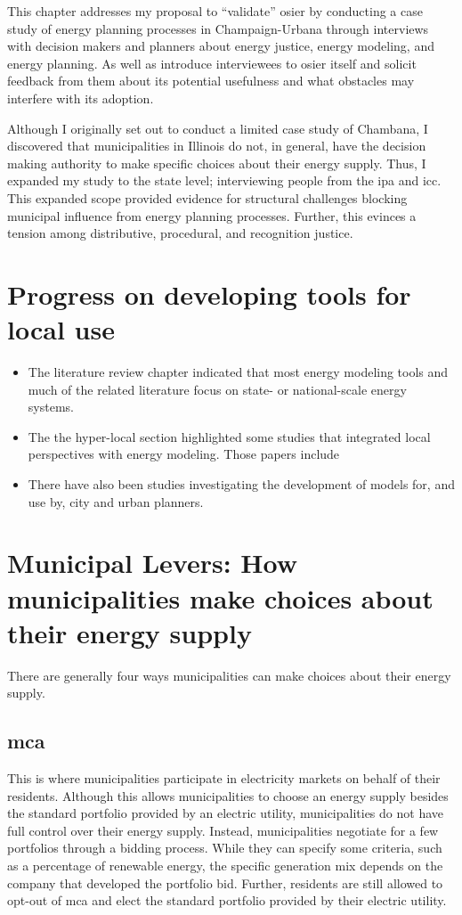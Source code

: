 This chapter addresses my proposal to ``validate'' \ac{osier} by conducting a
case study of energy planning processes in Champaign-Urbana through interviews
with decision makers and planners about energy justice, energy modeling, and
energy planning. As well as introduce interviewees to \ac{osier} itself and
solicit feedback from them about its potential usefulness and what obstacles may
interfere with its adoption. 

Although I originally set out to conduct a limited case study of Chambana, I
discovered that municipalities in Illinois do not, in general, have the decision
making authority to make specific choices about their energy supply.
Thus, I expanded my study to the state level; interviewing people from the
\ac{ipa} and \ac{icc}. This expanded scope provided evidence for structural
challenges blocking municipal influence from energy planning processes. Further,
this evinces a tension among distributive, procedural, and recognition justice.

\section{Progress on developing tools for local use}

\begin{itemize}
    \item The literature review chapter indicated that most energy modeling tools
    and much of the related literature focus on state- or national-scale energy
    systems.
    \item The the hyper-local section highlighted some studies that integrated
    local perspectives with energy modeling. Those papers include 
    \cite{mckenna_combining_2018, johannsen_municipal_2023, fleischhacker_portfolio_2019}
    \item There have also been studies investigating the development of models for, and
    use by, city and urban planners.
\end{itemize}

\section{Municipal Levers: How municipalities make choices about their energy supply}
There are generally four ways municipalities can make choices about their energy supply.

\subsection{\ac{mca}}
This is where municipalities participate in electricity markets on behalf of
their residents. Although this allows municipalities to choose an energy supply
besides the standard portfolio provided by an electric utility, municipalities
do not have full control over their energy supply. Instead, municipalities
negotiate for a few portfolios through a bidding process. While they can specify
some criteria, such as a percentage of renewable energy, the specific generation
mix depends on the company that developed the portfolio bid. Further, residents
are still allowed to opt-out of \ac{mca} and elect the standard portfolio
provided by their electric utility.

